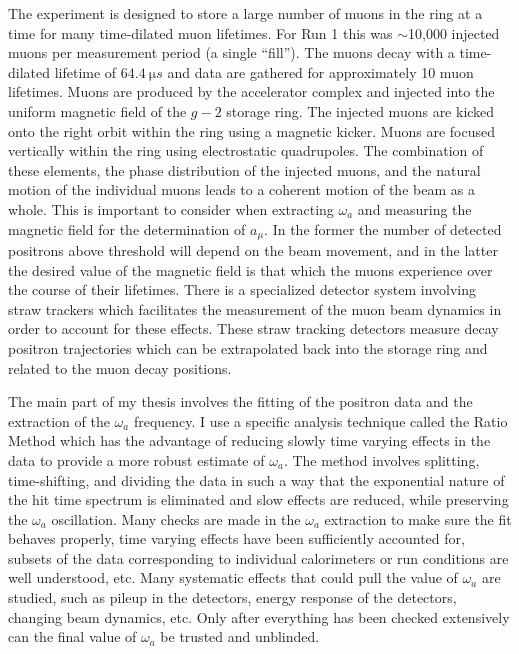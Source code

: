 \documentclass[12pt,letterpaper]{article}
\def\wa{$\omega_{a}$\xspace}
\def\gmtwo{$g-2$\xspace}
\begin{document}
The experiment is designed to store a large number of muons in the ring at a time for many time-dilated muon lifetimes. For Run 1 this was $\sim$10,000 injected muons per measurement period (a single ``fill''). The muons decay with a time-dilated lifetime of $\SI{64.4}{\micro s}$ and data are gathered for approximately 10 muon lifetimes. Muons are produced by the accelerator complex and injected into the uniform magnetic field of the \gmtwo storage ring. The injected muons are kicked onto the right orbit within the ring using a magnetic kicker. Muons are focused vertically within the ring using electrostatic quadrupoles. The combination of these elements, the phase distribution of the injected muons, and the natural motion of the individual muons leads to a coherent motion of the beam as a whole. This is important to consider when extracting \wa and measuring the magnetic field for the determination of $a_{\mu}$. In the former the number of detected positrons above threshold will depend on the beam movement, and in the latter the desired value of the magnetic field is that which the muons experience over the course of their lifetimes. There is a specialized detector system involving straw trackers which facilitates the measurement of the muon beam dynamics in order to account for these effects. These straw tracking detectors measure decay positron trajectories which can be extrapolated back into the storage ring and related to the muon decay positions.


The main part of my thesis involves the fitting of the positron data and the extraction of the \wa frequency. I use a specific analysis technique called the Ratio Method which has the advantage of reducing slowly time varying effects in the data to provide a more robust estimate of \wa. The method involves splitting, time-shifting, and dividing the data in such a way that the exponential nature of the hit time spectrum is eliminated and slow effects are reduced, while preserving the \wa oscillation. Many checks are made in the \wa extraction to make sure the fit behaves properly, time varying effects have been sufficiently accounted for, subsets of the data corresponding to individual calorimeters or run conditions are well understood, etc. Many systematic effects that could pull the value of \wa are studied, such as pileup in the detectors, energy response of the detectors, changing beam dynamics, etc. Only after everything has been checked extensively can the final value of \wa be trusted and unblinded. 
\end{document}
